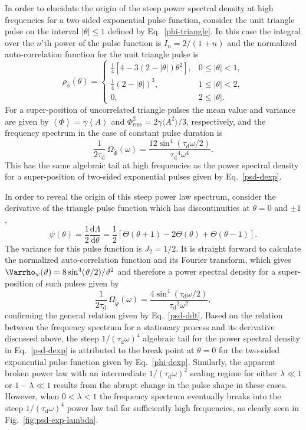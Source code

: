 \documentclass[aps,prb,12pt,a4paper,preprint,amsmath,amssymb,groupedaddress]{revtex4-1}
\newcommand{\ave}[1]{{\left<#1\right>}}
\newcommand{\abs}[1]{{\left|#1\right|}}\newcommand{\order}[1]{{\mathcal{O}\left(#1\right)}}
\newcommand{\rmd}{\text{d}}
\newcommand{\taud}{\ensuremath{\tau_\text{d}}}
\newcommand{\Phiave}{\ensuremath{\ave{\Phi}}}
\newcommand{\Phirms}{\ensuremath{\Phi}_\text{rms}}
\newcommand{\Phiwt}{\ensuremath{\widetilde{\Phi}}}
\newcommand{\Psiwt}{\ensuremath{\widetilde{\Psi}}}
\newcommand{\Aave}{\ensuremath{\ave{A}}}
\newcommand{\Eqref}[1]{Eq.~\eqref{#1}}
\newcommand{\Figref}[1]{Fig.~\ref{#1}}
\begin{document}
In order to elucidate the origin of the steep power spectral density at high frequencies for a two-sided exponential pulse function, consider the unit triangle pulse on the interval $\abs{\theta}\leq1$ defined by \Eqref{phi-triangle}. In this case the integral over the $n$'th power of the pulse function is $I_n=2/(1+n)$ and the normalized auto-correlation function for the unit triangle pulse is
\begin{equation}
\rho_\phi(\theta) = 
\begin{cases}
\frac{1}{4}\left[ 4-3(2-\abs{\theta})\theta^2 \right] , & 0 \leq \abs{\theta} < 1 ,
\\
\frac{1}{4}(2-\abs{\theta})^3 , & 1 \leq \abs{\theta} < 2 ,
\\
0 , & 2 \leq \abs{\theta} .
\end{cases}
\end{equation}
For a super-position of uncorrelated triangle pulses the mean value and variance are given by $\Phiave=\gamma\Aave$ and $\Phirms^2=2\gamma\langle{A^2}\rangle/3$, respectively, and the frequency spectrum in the case of constant pulse duration is
\begin{equation}\label{psd-triangle}
\frac{1}{2\taud}\,\Omega_{\Phiwt}(\omega) = \frac{12\sin^4(\taud\omega/2)}{\taud^4\omega^4} .
\end{equation}
This has the same algebraic tail at high frequencies as the power spectral density for a super-position of two-sided exponential pulses given by \Eqref{psd-dexp}.


In order to reveal the origin of this steep power law spectrum, consider the derivative of the triangle pulse function which has discontinuities at $\theta=0$ and $\pm1$,
\begin{equation}
\psi(\theta) = \frac{1}{2}\frac{\rmd\Lambda}{\rmd\theta} = \frac{1}{2}\left[ \Theta(\theta+1) - 2\Theta(\theta) + \Theta(\theta-1) \right] .
\end{equation}
The variance for this pulse function is $J_2=1/2$. It is straight forward to calculate the normalized auto-correlation function and its Fourier transform, which gives $\Varrho_\psi(\vartheta)=8\sin^4(\vartheta/2)/\vartheta^2$ and therefore a power spectral density for a super-position of such pulses given by
\begin{equation}
\frac{1}{2\taud}\,\Omega_{\Psiwt}(\omega) = \frac{4\sin^4(\taud\omega/2)}{\taud^2\omega^2} ,
\end{equation}
confirming the general relation given by \Eqref{psd-ddt}. Based on the relation between the frequency spectrum for a stationary process and its derivative discussed above, the steep $1/(\taud\omega)^4$ algebraic tail for the power spectral density in \Eqref{psd-dexp} is attributed to the break point at $\theta=0$ for the two-sided exponential pulse function given by \Eqref{phi-dexp}. Similarly, the apparent broken power law with an intermediate $1/(\taud\omega)^2$ scaling regime for either $\lambda\ll1$ or $1-\lambda\ll1$ results from the abrupt change in the pulse shape in these cases. However, when $0<\lambda<1$ the frequency spectrum eventually breaks into the steep $1/(\taud\omega)^4$ power law tail for sufficiently high frequencies, as clearly seen in \Figref{fig:psd-exp-lambda}.
\end{document}
